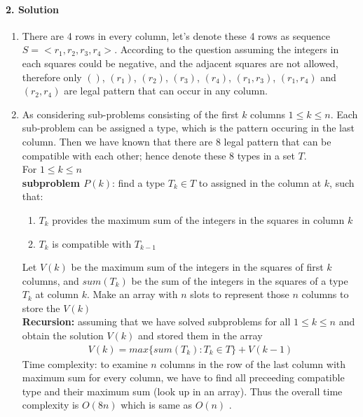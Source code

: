 \documentclass[a4paper]{scrartcl}
\begin{document}
\paragraph{2. Solution}
\label{sec:Question 2}
\begin{enumerate}[label=(\alph*)]
  \item There are 4 rows in every column, let's denote these 4 rows as sequence $S=\big<r_1,r_2,r_3,r_4\big>$.
  According to the question assuming the integers in each squares could be negative, and the adjacent squares are not allowed, therefore only $()$, $(r_1)$, $(r_2)$, $(r_3)$, $(r_4)$, $(r_1, r_3)$, $(r_1, r_4)$ and $(r_2, r_4)$ are legal pattern that can occur in any column. \\
  \item As considering sub-problems consisting of the first $k$ columns $1\leq k \leq n$. Each sub-problem can be assigned a type, which is the pattern occuring in the last column. Then we have known that there are 8 legal pattern that can be compatible with each other; hence denote these 8 types in a set $T$. \\ 
  For $1\leq k \leq n$\\
  \textbf{subproblem $P(k)$}: find a type $T_k \in T$ to assigned in the column at $k$, such that: 
  \begin{enumerate}[label=(\arabic{*})]
    \item $T_k$ provides the maximum sum of the integers in the squares in column $k$
    \item $T_k$ is compatible with $T_{k-1}$
  \end{enumerate}
  Let $V(k)$ be the maximum sum of the integers in the squares of first $k$ columns, and $sum(T_k)$ be the sum of the integers in the squares of a type $T_k$ at column $k$.
  Make an array with $n$ slots to represent those $n$ columns to store the $V(k)$\\
\textbf{Recursion:} assuming that we have solved subproblems for all $1\leq k \leq n$ and obtain the solution $V(k)$ and stored them in the array
\begin{align*}
  V(k)=  max\{ sum(T_k) : T_k \in T \} +V(k-1) 
\end{align*}
Time complexity: to examine $n$ columns in the row of the last column with maximum sum for every column, we have to find all preceeding compatible type and their maximum sum (look up in an array). Thus the overall time complexity is $O(8n)$ which is same as $O(n)$ .
\end{enumerate}
\end{document}
